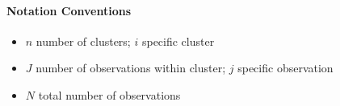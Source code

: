 \documentclass[a4paper]{article}
\begin{document}
\paragraph{Notation Conventions}

\begin{itemize}
	\item $n$ number of clusters; $i$ specific cluster
	\item $J$ number of observations within cluster; $j$ specific observation
	\item $N$ total number of observations
\end{itemize}
\end{document}
